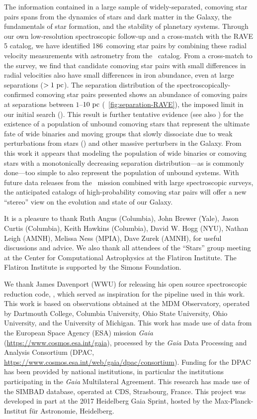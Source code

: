 \documentclass[modern, letterpaper]{aastex61}
\newcommand{\gaia}{\project{Gaia}}
\newcommand{\DR}[1]{\acronym{DR}#1}
\newcommand{\tgas}{\acronym{TGAS}}
\newcommand{\ncomovingtotal}{186}
\begin{document}
The information contained in a large sample of widely-separated, comoving star
pairs spans from the dynamics of stars and dark matter in the Galaxy, the
fundamentals of star formation, and the stability of planetary systems.
Through our own low-resolution spectroscopic follow-up and a cross-match with
the RAVE \DR{5} catalog, we have identified \ncomovingtotal\ comoving star pairs
by combining these radial velocity measurements with astrometry from the \tgas\
catalog.
From a cross-match to the  survey, we find that candidate
comoving star pairs with small differences in radial velocities also have small
differences in iron abundance, even at large separations ($>1~\mathrm{pc}$).
The separation distribution of the spectroscopically-confirmed comoving star
pairs presented shows an abundance of comoving pairs at separations between
$1$--$10~\mathrm{pc}$ (\figurename~\ref{fig:separation-RAVE}), the imposed limit in our
initial search (\citealt{Oh:2017}).
This result is further tentative evidence (see also \citealt{Shaya:2011}) for
the existence of a population of unbound comoving stars that represent the
ultimate fate of wide binaries and moving groups that slowly dissociate due to
weak perturbations from stars (\citealt{Jiang:2010}) and other massive
perturbers in the Galaxy.
From this work it appears that modeling the population of wide binaries or
comoving stars with a monotonically decreasing separation distribution---as is commonly done---too simple to also represent the population of unbound systems.
With future data releases from the \gaia\ mission combined with large
spectroscopic surveys, the anticipated catalogs of high-probability comoving
star pairs will offer a new ``stereo'' view on the evolution and state of our
Galaxy.

\acknowledgements

It is a pleasure to thank
Ruth Angus (Columbia),
John Brewer (Yale),
Jason Curtis (Columbia),
Keith Hawkins (Columbia),
David W. Hogg (NYU),
Nathan Leigh (AMNH),
Melissa Ness (MPIA),
Dave Zurek (AMNH),
for useful discussions and advice.
We also thank all attendees of the ``Stars'' group meeting at the Center for
Computational Astrophysics at the Flatiron Institute.
The Flatiron Institute is supported by the Simons Foundation.

We thank James Davenport (WWU) for releasing his open source spectroscopic
reduction code, \package{PyDIS}, which served as inspiration for the pipeline
used in this work.
This work is based on observations obtained at the MDM Observatory, operated by
Dartmouth College, Columbia University, Ohio State University, Ohio University,
and the University of Michigan.
This work has made use of data from the European Space Agency (ESA)
mission {\it Gaia} (\url{https://www.cosmos.esa.int/gaia}), processed by
the {\it Gaia} Data Processing and Analysis Consortium (DPAC,
\url{https://www.cosmos.esa.int/web/gaia/dpac/consortium}). Funding
for the DPAC has been provided by national institutions, in particular
the institutions participating in the {\it Gaia} Multilateral Agreement.
This research has made use of the SIMBAD database, operated at CDS, Strasbourg,
France.
This project was developed in part at the 2017 Heidelberg Gaia Sprint, hosted by
the Max-Planck-Institut f\"ur Astronomie, Heidelberg.
\end{document}
